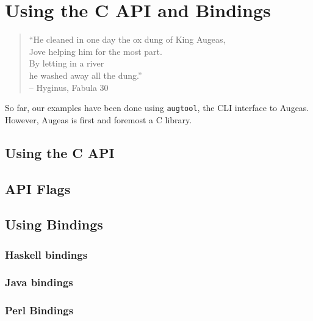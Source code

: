 \chapter{Using the C API and Bindings}

\label{chap:api}
 

\begin{verse}
``He cleaned in one day the ox dung of King Augeas, \\
Jove helping him for the most part. \\
By letting in a river \\
he washed away all the dung.''\\
\bigskip
\small{-- Hyginus, Fabula 30}
\end{verse}

So far, our examples have been done using \verb!augtool!, the CLI interface to Augeas. However, Augeas is first and foremost a C library.

\section{Using the C API}


\section{API Flags}

 

\section{Using Bindings}


\subsection{Haskell bindings}


\subsection{Java bindings}


\subsection{Perl Bindings}

